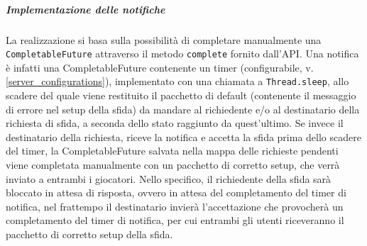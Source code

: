 \documentclass{article}
\begin{document}
    \subparagraph{Implementazione delle notifiche}
    La realizzazione si basa sulla possibilità di completare manualmente una \texttt{CompletableFuture} attraverso il metodo \texttt{complete} fornito dall'API. Una notifica è infatti una CompletableFuture contenente un timer (configurabile, v.\ref{server_configurations}), implementato con una chiamata a \texttt{Thread.sleep}, allo scadere del quale viene restituito il pacchetto di default (contenente il messaggio di errore nel setup della sfida) da mandare al richiedente e/o al destinatario della richiesta di sfida, a seconda dello stato raggiunto da quest'ultimo. Se invece il destinatario della richiesta, riceve la notifica e accetta la sfida prima dello scadere del timer, la CompletableFuture salvata nella mappa delle richieste pendenti viene completata manualmente con un pacchetto di corretto setup, che verrà inviato a entrambi i giocatori. Nello specifico, il richiedente della sfida sarà bloccato in attesa di risposta, ovvero in attesa del completamento del timer di notifica, nel frattempo il destinatario invierà  l'accettazione che provocherà un completamento del timer di notifica, per cui entrambi gli utenti riceveranno il pacchetto di corretto setup della sfida.
\end{document}
